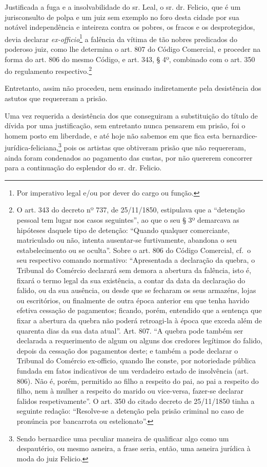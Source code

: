 Justificada a fuga e a insolvabilidade do sr. Leal, o sr. dr. Felicio,
que é um jurisconsulto de polpa e um juiz sem exemplo no foro desta
cidade por sua notável independência e inteireza contra os pobres, os
fracos e os desprotegidos, devia declarar \emph{ex-officio}\footnote{
  Por imperativo legal e/ou por dever do cargo ou função.} a falência da
vítima de tão nobres predicados do poderoso juiz, como lhe determina o
art. 807 do Código Comercial, e proceder na forma do art. 806 do mesmo
Código, e art. 343, § 4º, combinado com o art. 350 do regulamento
respectivo.\footnote{ O art. 343 do decreto nº 737, de 25/11/1850,
  estipulava que a ``detenção pessoal tem lugar nos casos seguintes'', ao
  que o seu § 3º demarcava as hipóteses daquele tipo de detenção:
  ``Quando qualquer comerciante, matriculado ou não, intenta ausentar-se
  furtivamente, abandona o seu estabelecimento ou se oculta''. Sobre o
  art. 806 do Código Comercial, cf.~o seu respectivo comando normativo:
  ``Apresentada a declaração da quebra, o Tribunal do Comércio declarará
  sem demora a abertura da falência, isto é, fixará o termo legal da sua
  existência, a contar da data da declaração do falido, ou da sua
  ausência, ou desde que se fecharam os seus armazéns, lojas ou
  escritórios, ou finalmente de outra época anterior em que tenha havido
  efetiva cessação de pagamentos; ficando, porém, entendido que a
  sentença que fixar a abertura da quebra não poderá retroagi-la à época
  que exceda além de quarenta dias da sua data atual''. Art. 807. ``A
  quebra pode também ser declarada a requerimento de algum ou alguns dos
  credores legítimos do falido, depois da cessação dos pagamentos deste;
  e também a pode declarar o Tribunal do Comércio ex-officio, quando lhe
  conste, por notoriedade pública fundada em fatos indicativos de um
  verdadeiro estado de insolvência (art. 806). Não é, porém, permitido
  ao filho a respeito do pai, ao pai a respeito do filho, nem à mulher a
  respeito do marido ou vice-versa, fazer-se declarar falidos
  respetivamente''. O art. 350 do citado decreto de 25/11/1850 tinha a
  seguinte redação: ``Resolve-se a detenção pela prisão criminal no caso
  de pronúncia por bancarrota ou estelionato''.}

Entretanto, assim não procedeu, nem ensinado indiretamente pela
desistência dos astutos que requereram a prisão.

Uma vez requerida a desistência dos que conseguiram a substituição do
título de dívida por uma justificação, sem entretanto nunca pensarem em
prisão, foi o homem posto em liberdade, e até hoje não sabemos em que
fica esta bernardice-jurídica-feliciana,\footnote{ Sendo bernardice uma
  peculiar maneira de qualificar algo como um despautério, ou mesmo
  asneira, a frase seria, então, uma asneira jurídica à moda do juiz
  Felicio.} pois os artistas que obtiveram prisão que não requereram,
ainda foram condenados ao pagamento das custas, por não quererem
concorrer para a continuação do esplendor do sr. dr. Felicio.

